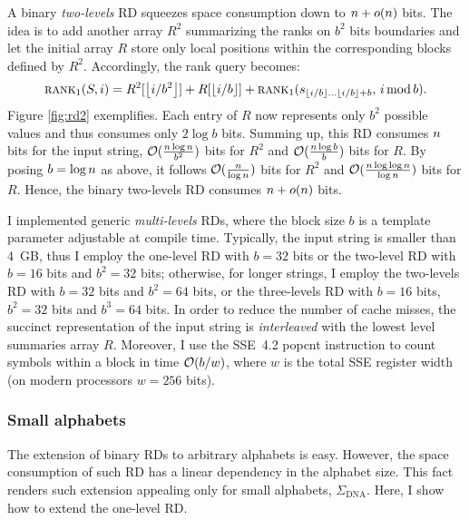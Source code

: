 A binary \emph{two-levels} RD squeezes space consumption down to $n + o(n)$ bits.
The idea is to add another array $R^2$ summarizing the ranks on $b^2$ bits boundaries and let the initial array $R$ store only local positions within the corresponding blocks defined by $R^2$.
Accordingly, the rank query becomes:
\begin{eqnarray}
\rank_1(\String,i) = R^2[\xfloor{i/b^2}] + R[\xfloor{i/b}] + \rank_1(s_{\xfloor{i/b} \dots \xfloor{i/b}+b}, \, i \imod{b}).
\end{eqnarray}
Figure \ref{fig:rd2} exemplifies.
Each entry of $R$ now represents only $b^2$ possible values and thus consumes only $2\log{b}$ bits.
Summing up, this RD consumes $n$ bits for the input string, $\mathcal{O}(\frac{n \log{n}}{b^2})$ bits for $R^2$ and $\mathcal{O}(\frac{n \log{b}}{b})$ bits for $R$.
By posing $b=\log{n}$ as above, it follows $\mathcal{O}(\frac{n}{\log{n}})$ bits for $R^2$ and $\mathcal{O}(\frac{n \log{\log{n}}}{\log{n}})$ bits for $R$.
Hence, the binary two-levels RD consumes $n + o(n)$ bits.

I implemented generic \emph{multi-levels} RDs, where the block size $b$ is a template parameter adjustable at compile time.
Typically, the input string is smaller than 4~GB, thus I employ the one-level RD with $b = 32$ bits or the two-level RD with $b = 16$ bits and $b^2 = 32$ bits;
otherwise, for longer strings, I employ the two-levels RD with $b = 32$ bits and $b^2 = 64$ bits, or the three-levels RD with $b = 16$ bits, $b^2 = 32$ bits and $b^3 = 64$ bits.
In order to reduce the number of cache misses, the succinct representation of the input string is \emph{interleaved} with the lowest level summaries array $R$.
Moreover, I use the SSE~4.2 popcnt instruction \citep{Intel2011} to count symbols within a block in time $\mathcal{O}(b/w)$, where $w$ is the total SSE register width (on modern processors $w=256$ bits).

\subsubsection{Small alphabets}

The extension of binary RDs to arbitrary alphabets is easy.
However, the space consumption of such RD has a linear dependency in the alphabet size.
This fact renders such extension appealing only for small alphabets, \eg $\Sigma_{\text{DNA}}$.
Here, I show how to extend the one-level RD.

